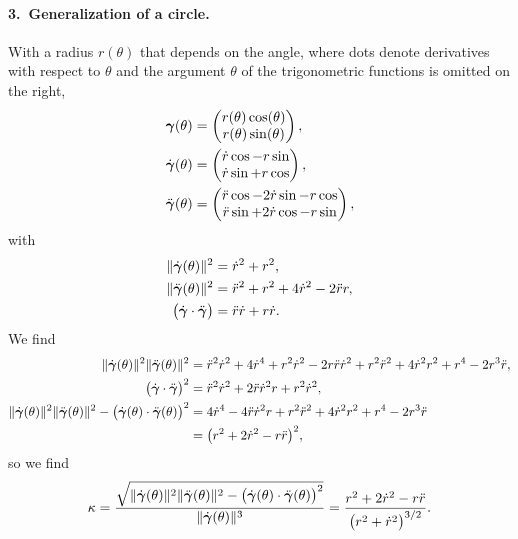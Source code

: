 \paragraph{3.\ Generalization of a circle.}
With a radius $r(\theta)$ that depends on the angle, where dots denote
derivatives with respect to $\theta$ and the argument $\theta$ of the
trigonometric functions is omitted on the right,
\begin{align*}
  \bm{\gamma}(\theta) &=
  \begin{pmatrix} r(\theta)\cos(\theta) \\ r(\theta)\sin(\theta) \end{pmatrix} , \\
  \dot{\bm{\gamma}}(\theta) &=
  \begin{pmatrix} \dot{r}\cos - r\sin \\ \dot{r}\sin + r\cos \end{pmatrix} , \\
  \ddot{\bm{\gamma}}(\theta) &=
  \begin{pmatrix} \ddot{r}\cos - 2\dot{r}\sin - r\cos \\
                  \ddot{r}\sin + 2\dot{r}\cos - r\sin \end{pmatrix} ,
\end{align*}
with
\begin{align*}
  \lVert \dot{\bm{\gamma}}(\theta) \rVert^2 &= \dot{r}^2 + r^2 , \\
  \lVert \ddot{\bm{\gamma}}(\theta) \rVert^2 &=
    \ddot{r}^2 + r^2 + 4\dot{r}^2 - 2\ddot{r}r , \\
  \bigl(\dot{\bm{\gamma}} \cdot \ddot{\bm{\gamma}}\bigr) &=
    \ddot{r}\dot{r} + r\dot{r} .
\end{align*}
We find
\begin{align*}
  \lVert \dot{\bm{\gamma}}(\theta) \rVert^2
  \lVert \ddot{\bm{\gamma}}(\theta) \rVert^2
  &= \ddot{r}^2\dot{r}^2 + 4\dot{r}^4 + r^2\dot{r}^2 - 2r\ddot{r}\dot{r}^2
   + r^2\ddot{r}^2 + 4\dot{r}^2r^2 + r^4 - 2r^3\ddot{r} , \\
  \bigl(\dot{\bm{\gamma}} \cdot \ddot{\bm{\gamma}}\bigr)^2
  &= \ddot{r}^2\dot{r}^2 + 2\ddot{r}\dot{r}^2 r + r^2\dot{r}^2 , \\
  \lVert \dot{\bm{\gamma}}(\theta) \rVert^2
  \lVert \ddot{\bm{\gamma}}(\theta) \rVert^2
  - \bigl(\dot{\bm{\gamma}}(\theta) \cdot \ddot{\bm{\gamma}}(\theta)\bigr)^2
  &= 4\dot{r}^4 - 4\ddot{r}\dot{r}^2 r + r^2\ddot{r}^2
   + 4\dot{r}^2r^2 + r^4 - 2r^3\ddot{r} \\
  &= \bigl(r^2 + 2\dot{r}^2 - r\ddot{r}\bigr)^2 ,
\end{align*}
so we find
\[
  \kappa
  = \frac{\sqrt{ \lVert \dot{\bm{\gamma}}(\theta) \rVert^2
                 \lVert \ddot{\bm{\gamma}}(\theta) \rVert^2
               - \bigl(\dot{\bm{\gamma}}(\theta) \cdot \ddot{\bm{\gamma}}(\theta)\bigr)^2 }}
         {\lVert \dot{\bm{\gamma}}(\theta) \rVert^3}
  = \frac{r^2 + 2\dot{r}^2 - r\ddot{r}}{\bigl(r^2 + \dot{r}^2\bigr)^{3/2}} .
\]

